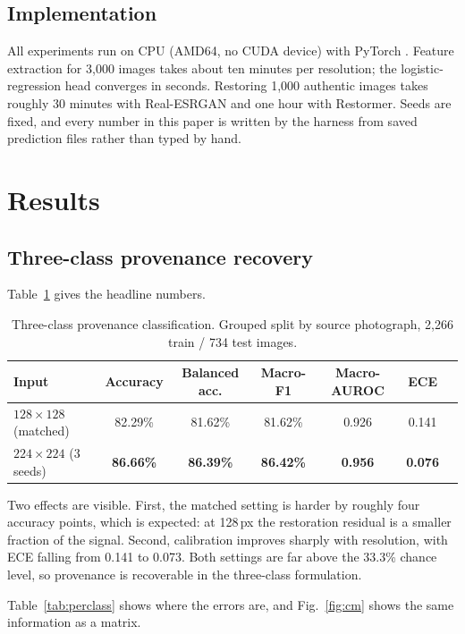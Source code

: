 \documentclass[runningheads]{llncs}
\newcommand{\best}[1]{\textbf{#1}}
\begin{document}
\subsection{Implementation}

All experiments run on CPU (AMD64, no CUDA device) with PyTorch
\cite{paszke2019pytorch}. Feature extraction for 3{,}000 images takes about ten
minutes per resolution; the logistic-regression head converges in seconds. Restoring
1{,}000 authentic images takes roughly 30 minutes with Real-ESRGAN and one hour with
Restormer. Seeds are fixed, and every number in this paper is written by the harness
from saved prediction files rather than typed by hand.

\section{Results}

\subsection{Three-class provenance recovery}

Table~\ref{tab:main} gives the headline numbers.

\begin{table}[t]
\centering
\caption{Three-class provenance classification. Grouped split by source
photograph, 2{,}266 train / 734 test images.}
\label{tab:main}
\begin{tabular}{@{}lcccccc@{}}
\toprule
Input & Accuracy & Balanced acc. & Macro-F1 & Macro-AUROC & ECE \\
\midrule
$128\times128$ (matched) & 82.29\% & 81.62\% & 81.62\% & 0.926 & 0.141 \\
$224\times224$ (3 seeds) & \best{86.66\%} & \best{86.39\%} & \best{86.42\%} & \best{0.956} & \best{0.076} \\
\bottomrule
\end{tabular}
\end{table}

Two effects are visible. First, the matched setting is harder by roughly four
accuracy points, which is expected: at 128\,px the restoration residual is a smaller
fraction of the signal. Second, calibration improves sharply with resolution, with
ECE falling from 0.141 to 0.073. Both settings are far above the 33.3\% chance level,
so provenance is recoverable in the three-class formulation.

Table~\ref{tab:perclass} shows where the errors are, and Fig.~\ref{fig:cm} shows the
same information as a matrix.
\end{document}
